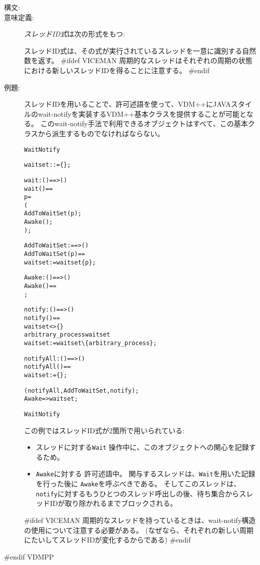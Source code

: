 \documentclass[\pformat,12pt]{jarticle}
\begin{document}
\begin{description}
\item[構文:] 
  
\item[意味定義:] {\it スレッドID式}は次の形式をもつ:

  \begin{alltt}
  \end{alltt}
  スレッドID式は、その式が実行されているスレッドを一意に識別する自然数を返す。
#ifdef VICEMAN
  周期的なスレッドはそれぞれの周期の状態における新しいスレッドIDを得ることに注意する。
#endif

\item[例題:] 
スレッドIDを用いることで、許可述語を使って、VDM++にJAVAスタイルのwait-notifyを実装するVDM++基本クラスを提供することが可能となる。
このwait-notify手法で利用できるオブジェクトはすべて、この基本クラスから派生するものでなければならない。
\begin{alltt}
 WaitNotify

    waitset :  := \{\};

    \PROTECTED wait: () ==> ()
    wait() == 
       p = 
       (
        AddToWaitSet( p );
        Awake();
       );

    AddToWaitSet :  ==> ()
    AddToWaitSet( p ) ==
      waitset := waitset  \{ p \};
      
    Awake: () ==> ()
    Awake() == 
      ;
  
    \PROTECTED notify: () ==> ()
    notify() == 
         waitset <> \{\} 
           arbitrary_process  waitset
            waitset := waitset \verb+\+ \{arbitrary_process\};

    \PROTECTED notifyAll: () ==> ()
    notifyAll() ==
         waitset := \{\};

    (notifyAll, AddToWaitSet, notify);
     Awake =>  waitset;

 WaitNotify
\end{alltt}
この例ではスレッドID式が2箇所で用いられている:
\begin{itemize}
\item スレッドに対する\texttt{Wait} 操作中に、このオブジェクトへの関心を記録するため。
\item  \texttt{Awake}に対する 許可述語中。
関与するスレッドは、\texttt{Wait}を用いた記録を行った後に \texttt{Awake}を呼ぶべきである。
そしてこのスレッドは、\texttt{notify}に対するもうひとつのスレッド呼出しの後、待ち集合からスレッドIDが取り除かれるまでブロックされる。
\end{itemize}

#ifdef VICEMAN
周期的なスレッドを持っているときは、wait-notify構造の使用について注意する必要がある。
(なぜなら、それぞれの新しい周期にたいしてスレッドIDが変化するからである)
#endif

\end{description}
#endif VDMPP
\end{document}
